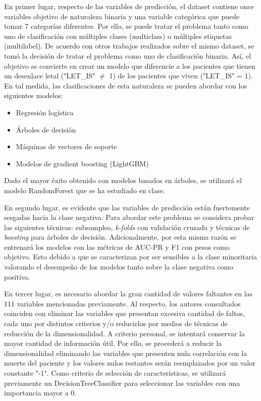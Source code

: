 \documentclass[conference]{IEEEtran}
\begin{document}
En primer lugar, respecto de las variables de predicción, el dataset contiene once variables objetivo de naturaleza binaria y una variable categórica que puede tomar 7 categorías diferentes. Por ello, se puede tratar el problema tanto como uno de clasificación
con múltiples clases (multiclass) o múltiples etiquetas (multilabel). De acuerdo con otros trabajos realizados sobre el mismo dataset, se tomó la decisión de tratar el problema como uno de clasificación binaria. Así, el objetivo se convierte en crear un modelo que diferencie a los pacientes que tienen un desenlace letal ("LET\_IS" $\neq$ 1) de los pacientes que viven ("LET\_IS" = 1). En tal medida, las clasificaciones de esta naturaleza se pueden abordar con los siguientes modelos:

\begin{itemize}
    \item Regresión logística
    \item Árboles de decisión
    \item Máquinas de vectores de soporte
    \item Modelos de gradient boosting (LightGBM)
\end{itemize}
Dado el mayor éxito obtenido con modelos basados en árboles, se utilizará el modelo RandomForest que se ha estudiado en clase.

En segundo lugar, es evidente que las variables de predicción están fuertemente sesgadas hacia la clase negativa. Para abordar este problema se considera probar las siguientes técnicas: subsampleo, \textit{k-folds} con validación cruzada y técnicas de \textit{boosting} para árboles de decisión. Adicionalmente, por esta misma razón se entrenará los modelos con las métricas de AUC-PR y F1 con pesos como objetivo. Esto debido a que se caracterizan por ser sensibles a la clase minoritaria valorando el desempeño de los modelos tanto sobre la clase negativa como positiva\cite{b?}. 

En tercer lugar, es necesario abordar la gran cantidad de valores faltantes en las 111 variables mencionadas previamente. Al respecto, los autores consultados coinciden con eliminar las variables que presentan excesiva cantidad de faltos, cada uno por distintos criterios y/o reducirlos por medios de técnicas de reducción de la dimensionalidad. A criterio personal, se intentará conservar la mayor cantidad de información útil. Por ello, se procederá a reducir la dimensionalidad eliminando las variables que presenten nula correlación con la muerte del paciente y los valores nulos restantes serán reemplazados por un valor constante "-1". Como criterio de selección de características, se utilizará previamente un DecisionTreeClassifier para seleccionar las variables con una importancia mayor a 0.
\end{document}
